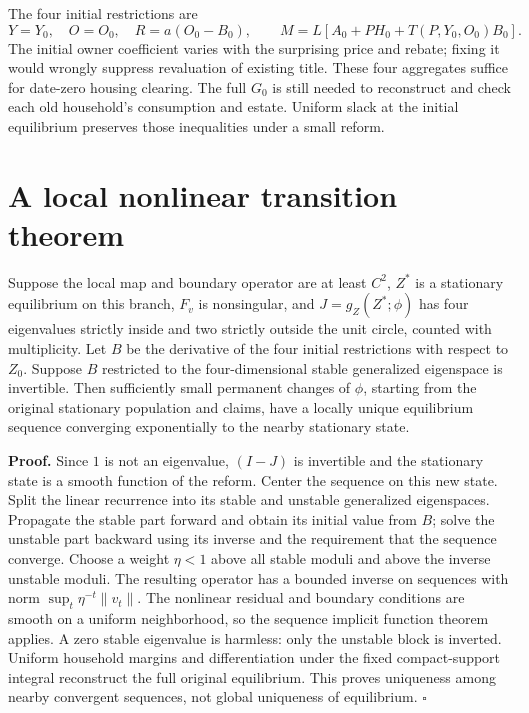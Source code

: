 \documentclass[
  11pt,
]{article}
\begin{document}
The four initial restrictions are \[
 Y=Y_0,\quad O=O_0,\quad R=a(O_0-B_0),\qquad
 M=L[A_0+PH_0+T(P,Y_0,O_0)B_0].
\] The initial owner coefficient varies with the surprising price and
rebate; fixing it would wrongly suppress revaluation of existing title.
These four aggregates suffice for date-zero housing clearing. The full
\(G_0\) is still needed to reconstruct and check each old household's
consumption and estate. Uniform slack at the initial equilibrium
preserves those inequalities under a small reform.

\section{A local nonlinear transition
theorem}\label{a-local-nonlinear-transition-theorem}

Suppose the local map and boundary operator are at least \(C^2\),
\(Z^*\) is a stationary equilibrium on this branch, \(F_v\) is
nonsingular, and \(J=g_Z(Z^*;\phi)\) has four eigenvalues strictly
inside and two strictly outside the unit circle, counted with
multiplicity. Let \(B\) be the derivative of the four initial
restrictions with respect to \(Z_0\). Suppose \(B\) restricted to the
four-dimensional stable generalized eigenspace is invertible. Then
sufficiently small permanent changes of \(\phi\), starting from the
original stationary population and claims, have a locally unique
equilibrium sequence converging exponentially to the nearby stationary
state.

\textbf{Proof.} Since \(1\) is not an eigenvalue, \((I-J)\) is
invertible and the stationary state is a smooth function of the reform.
Center the sequence on this new state. Split the linear recurrence into
its stable and unstable generalized eigenspaces. Propagate the stable
part forward and obtain its initial value from \(B\); solve the unstable
part backward using its inverse and the requirement that the sequence
converge. Choose a weight \(\eta<1\) above all stable moduli and above
the inverse unstable moduli. The resulting operator has a bounded
inverse on sequences with norm \(\sup_t\eta^{-t}\|v_t\|\). The nonlinear
residual and boundary conditions are smooth on a uniform neighborhood,
so the sequence implicit function theorem applies. A zero stable
eigenvalue is harmless: only the unstable block is inverted. Uniform
household margins and differentiation under the fixed compact-support
integral reconstruct the full original equilibrium. This proves
uniqueness among nearby convergent sequences, not global uniqueness of
equilibrium. \(\square\)
\end{document}
